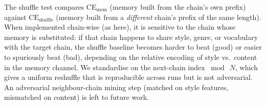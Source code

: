 \documentclass{article}
\newcommand{\CEmem}{\mathrm{CE}_{\text{mem}}}
\newcommand{\CEsh}{\mathrm{CE}_{\text{shuffle}}}
\begin{document}
The shuffle test compares $\CEmem$ (memory built from the chain's own
prefix) against $\CEsh$ (memory built from a \emph{different} chain's
prefix of the same length).  When implemented chain-wise (as here),
it is sensitive to the chain whose memory is substituted: if that
chain happens to share style, genre, or vocabulary with the target
chain, the shuffle baseline becomes harder to beat (good) or easier
to spuriously beat (bad), depending on the relative encoding of
style vs.\ content in the memory channel.  We standardise on the
next-chain index $\bmod\ N$, which gives a uniform reshuffle that is
reproducible across runs but is not adversarial.  An adversarial
neighbour-chain mining step (matched on style features, mismatched on
content) is left to future work.


\end{document}
